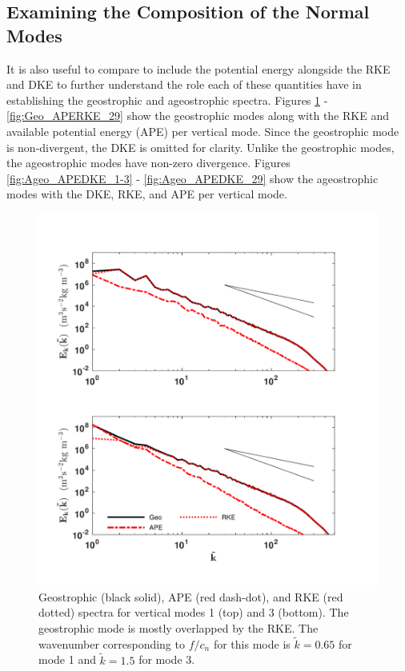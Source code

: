 \subsection{Examining the Composition of the Normal Modes}
It is also useful to compare to include the potential energy alongside the RKE and DKE  to further understand the role each of these quantities have in establishing the geostrophic and ageostrophic spectra. Figures \ref{fig:Geo_APERKE_1-3} - \ref{fig:Geo_APERKE_29} show the geostrophic modes along with the RKE and available potential energy (APE) per vertical mode. Since the geostrophic mode is non-divergent, the DKE is omitted for clarity. Unlike the geostrophic modes, the ageostrophic modes have non-zero divergence. Figures \ref{fig:Ageo_APEDKE_1-3} - \ref{fig:Ageo_APEDKE_29} show the ageostrophic modes with the DKE, RKE, and APE per vertical mode.

\begin{figure}[H]
\includegraphics[scale=1]{Chapter4/img/Geo_APERKE_1-3}
\caption{Geostrophic (black solid), APE (red dash-dot), and RKE (red dotted) spectra for vertical modes 1 (top) and 3 (bottom). The geostrophic mode is mostly overlapped by the RKE. The wavenumber corresponding to $f/c_n$ for this mode is $\tilde{k} = 0.65$ for mode 1 and $\tilde{k} = 1.5$ for mode 3.}
\label{fig:Geo_APERKE_1-3}
\end{figure}

